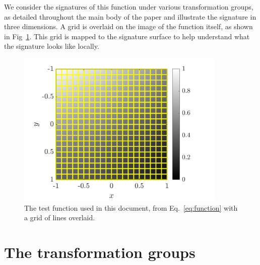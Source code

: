 \documentclass[11pt]{article}
\begin{document}
We consider the signatures of this function under various transformation
groups, as detailed throughout the main body of the paper and illustrate
the signature in three dimensions. A grid is overlaid on the image of the
function itself, as shown in Fig~\ref{fig:function_scanlines}. This grid is
mapped to the signature surface to help understand what the signature looks
like locally.
\begin{figure}
  \centering
  \includegraphics[width=10cm]{figures/function_scanlines}
  \caption{The test function used in this document, from
  Eq.~\eqref{eq:function} with a grid of lines
overlaid.}\label{fig:function_scanlines}
\end{figure}


\section{The transformation groups}
\end{document}
